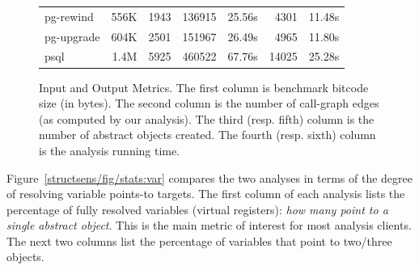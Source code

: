 \begin{figure}[htb!]
\begin{tabular}{l@{\quad}r r@{\quad}rr rr}
    pg-rewind  & 556K & 1943 & 136915 & 25.56s &  4301 & 11.48s \\
    pg-upgrade & 604K & 2501 & 151967 & 26.49s &  4965 & 11.80s \\
    psql       & 1.4M & 5925 & 460522 & 67.76s & 14025 & 25.28s \\
    \bottomrule
  \end{tabular}
  \caption[Input and Output Metrics]{%
    Input and Output Metrics. The first column is benchmark bitcode
    size (in bytes). The second column is the number of call-graph
    edges (as computed by our analysis). The third (resp. fifth)
    column is the number of abstract objects created. The fourth
    (resp. sixth) column is the analysis running time.}
  \label{structsens/fig/stats:misc}
\end{figure}



Figure~\ref{structsens/fig/stats:var} compares the two analyses in
terms of the degree of resolving variable points-to targets. The first
column of each analysis lists the percentage of fully resolved
variables (virtual registers): \emph{how many point to a single
  abstract object}. This is the main metric of interest for most
analysis clients. The next two columns list the percentage of
variables that point to two/three objects.

